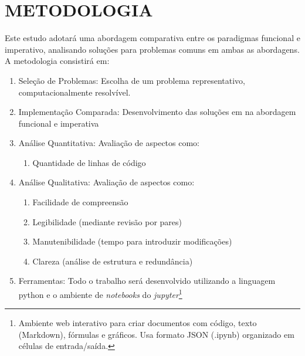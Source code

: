 
\section{METODOLOGIA}

Este estudo adotará uma abordagem comparativa entre os paradigmas funcional e imperativo, analisando soluções para problemas comuns em ambas as abordagens. A metodologia consistirá em:
\begin{enumerate}
    \item Seleção de Problemas: Escolha de um problema representativo, computacionalmente resolvível.
    \item Implementação Comparada: Desenvolvimento das soluções em na abordagem funcional e imperativa
    \item Análise Quantitativa: Avaliação de aspectos como:
    \begin{enumerate}
        \item Quantidade de linhas de código
    \end{enumerate}
    \item Análise Qualitativa: Avaliação de aspectos como:
    \begin{enumerate}
        \item Facilidade de compreensão
        \item Legibilidade (mediante revisão por pares)
        \item Manutenibilidade (tempo para introduzir modificações)
        \item Clareza (análise de estrutura e redundância)
    \end{enumerate}
    \item Ferramentas: Todo o trabalho será desenvolvido utilizando a linguagem python
        e o ambiente de \textit{notebooks} do \textit{jupyter}\footnote{
             Ambiente web interativo para criar documentos com código, texto (Markdown), fórmulas e gráficos. Usa formato JSON (.ipynb) organizado em células de entrada/saída\cite{wiki_jupyter_notebook}.
        }
\end{enumerate}